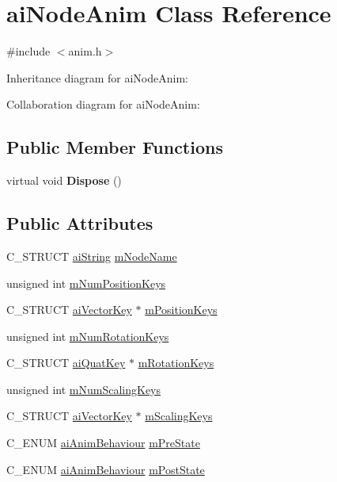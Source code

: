 \hypertarget{structai_node_anim}{\section{ai\+Node\+Anim Class Reference}
\label{structai_node_anim}
}


{\ttfamily \#include $<$anim.\+h$>$}



Inheritance diagram for ai\+Node\+Anim\+:


Collaboration diagram for ai\+Node\+Anim\+:
\subsection*{Public Member Functions}
\begin{DoxyCompactItemize}
\item 
\hypertarget{structai_node_anim_a69f192ce8ea4941e2990903757914c8f}{virtual void {\bfseries Dispose} ()}\label{structai_node_anim_a69f192ce8ea4941e2990903757914c8f}

\end{DoxyCompactItemize}
\subsection*{Public Attributes}
\begin{DoxyCompactItemize}
\item 
C\+\_\+\+S\+T\+R\+U\+C\+T \hyperlink{structai_string}{ai\+String} \hyperlink{structai_node_anim_a22a591381e75214ba03c6aaa770638f3}{m\+Node\+Name}
\item 
unsigned int \hyperlink{structai_node_anim_aab725313d31db70adab778a3c125103f}{m\+Num\+Position\+Keys}
\item 
C\+\_\+\+S\+T\+R\+U\+C\+T \hyperlink{structai_vector_key}{ai\+Vector\+Key} $\ast$ \hyperlink{structai_node_anim_a983d0db426ac7e5fce442beb19552db3}{m\+Position\+Keys}
\item 
unsigned int \hyperlink{structai_node_anim_aca7c78b89c4c64dcdf7619e105e0708c}{m\+Num\+Rotation\+Keys}
\item 
C\+\_\+\+S\+T\+R\+U\+C\+T \hyperlink{structai_quat_key}{ai\+Quat\+Key} $\ast$ \hyperlink{structai_node_anim_abe1b0b8b0b30a3950cf09023868a07ac}{m\+Rotation\+Keys}
\item 
unsigned int \hyperlink{structai_node_anim_a28fa0fd84571ac79cb45a537192738f6}{m\+Num\+Scaling\+Keys}
\item 
C\+\_\+\+S\+T\+R\+U\+C\+T \hyperlink{structai_vector_key}{ai\+Vector\+Key} $\ast$ \hyperlink{structai_node_anim_a4588122722d5148d6e590da820bdf35f}{m\+Scaling\+Keys}
\item 
C\+\_\+\+E\+N\+U\+M \hyperlink{anim_8h_a201b9e9429b82cd6423ff4a4daf01cef}{ai\+Anim\+Behaviour} \hyperlink{structai_node_anim_a305c01b60886a07b69f04b1db6d7d3c5}{m\+Pre\+State}
\item 
C\+\_\+\+E\+N\+U\+M \hyperlink{anim_8h_a201b9e9429b82cd6423ff4a4daf01cef}{ai\+Anim\+Behaviour} \hyperlink{structai_node_anim_a93cefd440cbaf587c136eb224d4a0327}{m\+Post\+State}
\end{DoxyCompactItemize}
